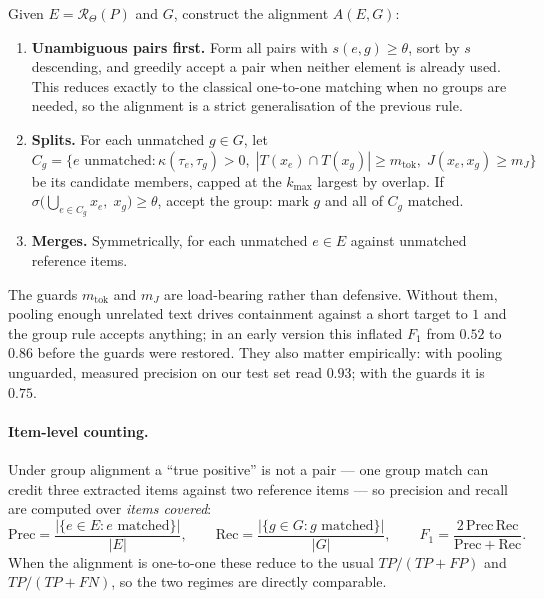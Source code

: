 Given $E = \mathcal{R}_\Theta(P)$ and $G$, construct the alignment $A(E,G)$:

\begin{enumerate}
  \item \textbf{Unambiguous pairs first.} Form all pairs with
    $s(e,g) \ge \theta$, sort by $s$ descending, and greedily accept a pair when
    neither element is already used. This reduces exactly to the classical
    one-to-one matching when no groups are needed, so the alignment is a strict
    generalisation of the previous rule.
  \item \textbf{Splits.} For each unmatched $g \in G$, let
    $C_g = \{e \text{ unmatched} : \kappa(\tau_e, \tau_g) > 0,\;
      |T(x_e) \cap T(x_g)| \ge m_{\mathrm{tok}},\;
      J(x_e, x_g) \ge m_J \}$
    be its candidate members, capped at the $k_{\max}$ largest by overlap.
    If $\sigma\big(\bigcup_{e \in C_g} x_e,\; x_g\big) \ge \theta$, accept the
    group: mark $g$ and all of $C_g$ matched.
  \item \textbf{Merges.} Symmetrically, for each unmatched $e \in E$ against
    unmatched reference items.
\end{enumerate}

The guards $m_{\mathrm{tok}}$ and $m_J$ are load-bearing rather than
defensive. Without them, pooling enough unrelated text drives containment
against a short target to $1$ and the group rule accepts anything; in an early
version this inflated $F_1$ from $0.52$ to $0.86$ before the guards were
restored. They also matter empirically: with pooling unguarded, measured
precision on our test set read $0.93$; with the guards it is $0.75$.

\paragraph{Item-level counting.}
Under group alignment a ``true positive'' is not a pair --- one group match can
credit three extracted items against two reference items --- so precision and
recall are computed over \emph{items covered}:
\begin{equation}
  \mathrm{Prec} = \frac{|\{e \in E : e \text{ matched}\}|}{|E|},
  \qquad
  \mathrm{Rec} = \frac{|\{g \in G : g \text{ matched}\}|}{|G|},
  \qquad
  F_1 = \frac{2\,\mathrm{Prec}\,\mathrm{Rec}}{\mathrm{Prec} + \mathrm{Rec}}.
  \label{eq:prf}
\end{equation}
When the alignment is one-to-one these reduce to the usual $TP/(TP{+}FP)$ and
$TP/(TP{+}FN)$, so the two regimes are directly comparable.

